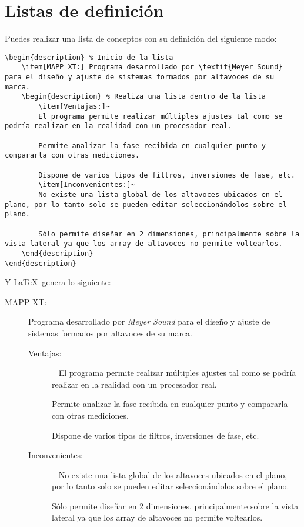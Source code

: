 \section{Listas de definición}
 
 Puedes realizar una lista de conceptos con su definición del siguiente modo:
 
\begin{lstlisting}[style=Latex-color]
\begin{description} % Inicio de la lista
 	\item[MAPP XT:] Programa desarrollado por \textit{Meyer Sound} para el diseño y ajuste de sistemas formados por altavoces de su marca.
  	\begin{description} % Realiza una lista dentro de la lista
  		\item[Ventajas:]~ 
  		El programa permite realizar múltiples ajustes tal como se podría realizar en la realidad con un procesador real.
  	
  		Permite analizar la fase recibida en cualquier punto y compararla con otras mediciones.
  	
  		Dispone de varios tipos de filtros, inversiones de fase, etc.
  		\item[Inconvenientes:]~ 
  		No existe una lista global de los altavoces ubicados en el plano, por lo tanto solo se pueden editar seleccionándolos sobre el plano.
  	
  		Sólo permite diseñar en 2 dimensiones, principalmente sobre la vista lateral ya que los array de altavoces no permite voltearlos.
  	\end{description}
\end{description}
\end{lstlisting}

 Y \LaTeX~genera lo siguiente:
 
\begin{description} %
 	\item[MAPP XT:] Programa desarrollado por \textit{Meyer Sound} para el diseño y ajuste de sistemas formados por altavoces de su marca.
  	\begin{description} %
  		\item[Ventajas:]~ 
  		El programa permite realizar múltiples ajustes tal como se podría realizar en la realidad con un procesador real.
  	
  		Permite analizar la fase recibida en cualquier punto y compararla con otras mediciones.
  	
  		Dispone de varios tipos de filtros, inversiones de fase, etc.
  		\item[Inconvenientes:]~ 
  		No existe una lista global de los altavoces ubicados en el plano, por lo tanto solo se pueden editar seleccionándolos sobre el plano.
  	
  		Sólo permite diseñar en 2 dimensiones, principalmente sobre la vista lateral ya que los array de altavoces no permite voltearlos.
  	\end{description}
\end{description}